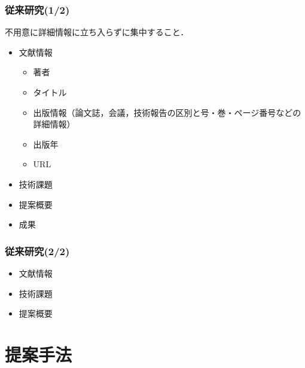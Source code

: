 \documentclass[dvipdfmx,cjk,t,10pt]{beamer}
\begin{document}
\begin{frame}
\frametitle{従来研究(1/2)}
	\begin{screen}
		不用意に詳細情報に立ち入らずに集中すること．
	\end{screen}
	\begin{itemize}
	\item 文献情報	
		\begin{itemize}		
		\item 著者
		\item タイトル
		\item 出版情報（論文誌，会議，技術報告の区別と号・巻・ページ番号などの詳細情報）		
		\item 出版年
		\item URL
		\end{itemize}			
	\item 技術課題
	\item 提案概要
	\item 成果
	\end{itemize}	
\end{frame}

\begin{frame}
\frametitle{従来研究(2/2)}
	\begin{itemize}
	\item 文献情報
	\item 技術課題
	\item 提案概要
	\end{itemize}	
\end{frame}

\section{提案手法}
\end{document}
